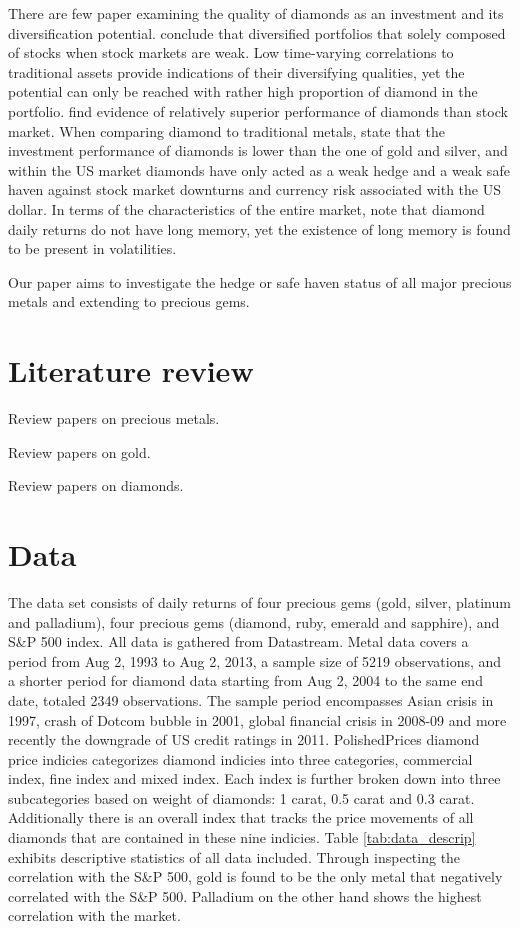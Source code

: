 \documentclass[preprint,authoryear,11pt]{elsarticle}
\begin{document}
There are few paper examining the quality of diamonds as an investment and its diversification potential. \citet{auer_diamonds_2013} conclude that diversified portfolios that solely composed of stocks when stock markets are weak. Low time-varying correlations to traditional assets provide indications of their diversifying qualities, yet the potential can only be reached with rather high proportion of diamond in the portfolio. \citet{renneboog_hard_2012} find evidence of relatively superior performance of diamonds than stock market. When comparing diamond to traditional metals, \citet{auer_could_2014} state that the investment performance of diamonds is lower than the one of gold and silver, and within the US market diamonds have only acted as a weak hedge and a weak safe haven against stock market downturns and currency risk associated with the US dollar. In terms of the characteristics of the entire market, \citet{chong_long-range_2012} note that diamond daily returns do not have long memory, yet the existence of long memory is found to be present in volatilities. 

Our paper aims to investigate the hedge or safe haven status of all major precious metals and extending to precious gems.


\section{Literature review}
\label{sec:litreview}

Review papers on precious metals.

Review papers on gold.

Review papers on diamonds.


\section{Data}
\label{sec:data}

The data set consists of daily returns of four precious gems (gold, silver, platinum and palladium), four precious gems (diamond, ruby, emerald and sapphire), and S\&P 500 index. All data is gathered from Datastream. Metal data covers a period from Aug 2, 1993 to Aug 2, 2013, a sample size of 5219 observations, and a shorter period for diamond data starting from Aug 2, 2004 to the same end date, totaled 2349 observations. The sample period encompasses Asian crisis in 1997, crash of Dotcom bubble in 2001, global financial crisis in 2008-09 and more recently the downgrade of US credit ratings in 2011. PolishedPrices diamond price indicies categorizes diamond indicies into three categories, commercial index, fine index and mixed index. Each index is further broken down into three subcategories based on weight of diamonds: 1 carat, 0.5 carat and 0.3 carat. Additionally there is an overall index that tracks the price movements of all diamonds that are contained in these nine indicies. Table \ref{tab:data_descrip}  exhibits descriptive statistics of all data included. Through inspecting the correlation with the S\&P 500, gold is found to be the only metal that negatively correlated with the S\&P 500. Palladium on the other hand shows the highest correlation with the market. 
\end{document}
